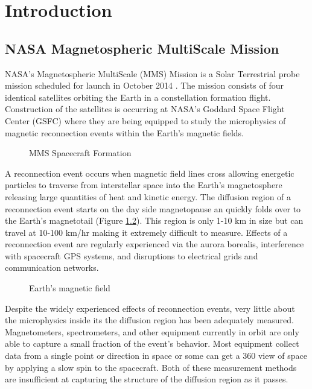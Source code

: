 

\chapter{Introduction}
\label{chap:Introduction}

\section{NASA Magnetospheric MultiScale Mission}
\label{sec:NASAMagnetosphericMultiScaleMission}

NASA's Magnetospheric MultiScale (MMS) Mission is a Solar Terrestrial probe mission scheduled for launch in October 2014 \cite{mms_website}.  The mission consists of four identical satellites orbiting the Earth in a constellation formation flight.  Construction of the satellites is occurring at NASA's Goddard Space Flight Center (GSFC) where they are being equipped to study the microphysics of magnetic reconnection events within the Earth's magnetic fields.

\begin{figure}[H]
\centerline{}
\caption{MMS Spacecraft Formation}
\label{fig:magneticfields}
\end{figure}

A reconnection event occurs when magnetic field lines cross allowing energetic particles to traverse from interstellar space into the Earth's magnetosphere releasing large quantities of heat and kinetic energy.  The diffusion region of a reconnection event starts on the day side magnetopause an quickly folds over to the Earth's magnetotail (Figure \ref{fig:magneticfields}).  This region is only 1-10 km in size but can travel at 10-100 km/hr \cite{swri} making it extremely difficult to measure.  Effects of a reconnection event are regularly experienced via the aurora borealis, interference with spacecraft GPS systems, and disruptions to electrical grids and communication networks.

\begin{figure}[H]
\centerline{}
\caption{Earth's magnetic field}
\label{fig:magneticfields}
\end{figure}

Despite the widely experienced effects of reconnection events, very little about the microphysics inside its the diffusion region has been adequately measured.  Magnetometers, spectrometers, and other equipment currently in orbit are only able to capture a small fraction of the event's behavior.  Most equipment collect data from a single point or direction in space or some can get a 360 view of space by applying a slow spin to the spacecraft.  Both of these measurement methods are insufficient at capturing the structure of the diffusion region as it passes.

